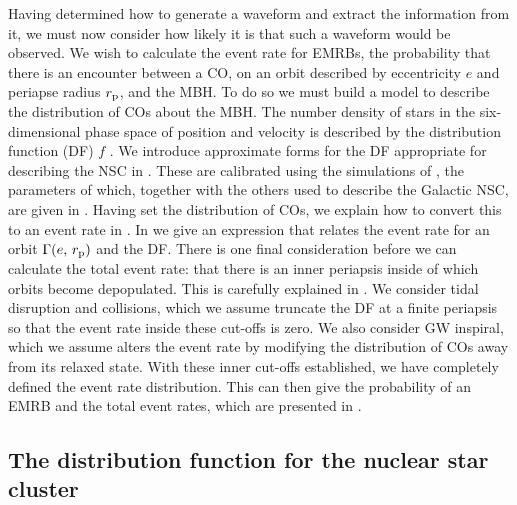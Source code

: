 Having determined how to generate a waveform and extract the information from it, we must now consider how likely it is that such a waveform would be observed. We wish to calculate the event rate for EMRBs, the probability that there is an encounter between a CO, on an orbit described by eccentricity $e$ and periapse radius $r_\mathrm{p}$, and the MBH. To do so we must build a model to describe the distribution of COs about the MBH. The number density of stars in the six-dimensional phase space of position and velocity is described by the distribution function (DF) $f$ \citep[section 4.1]{Binney2008}. We introduce approximate forms for the DF appropriate for describing the NSC in . These are calibrated using the simulations of \citet{Alexander2009}, the parameters of which, together with the others used to describe the Galactic NSC, are given in . Having set the distribution of COs, we explain how to convert this to an event rate in . In  we give an expression that relates the event rate for an orbit $\Gamma(e,\,r_\mathrm{p})$ and the DF. There is one final consideration before we can calculate the total event rate: that there is an inner periapsis inside of which orbits become depopulated. This is carefully explained in . We consider tidal disruption and collisions, which we assume truncate the DF at a finite periapsis so that the event rate inside these cut-offs is zero. We also consider GW inspiral, which we assume alters the event rate by modifying the distribution of COs away from its relaxed state. With these inner cut-offs established, we have completely defined the event rate distribution. This can then give the probability of an EMRB and the total event rates, which are presented in .

\subsection{The distribution function for the nuclear star cluster}\label{sec:DF}


